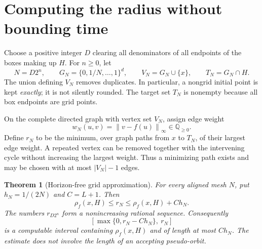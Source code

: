 \documentclass[11pt,letterpaper]{article}
\numberwithin{equation}{section}
\newtheorem{theorem}{Theorem}[section]
\theoremstyle{definition}
\theoremstyle{remark}
\newcommand{\Q}{\mathbb Q}
\newcommand{\norm}[1]{\left\lVert #1\right\rVert_{\infty}}
\begin{document}
\section{Computing the radius without bounding time}
\label{pqc:cb:sec:grid}

Choose a positive integer $D$ clearing all denominators of all endpoints of
the boxes making up $H$.  For $n\ge0$, let
\[
 N=D2^n,\qquad G_N=\{0,1/N,\ldots,1\}^d,
 \qquad V_N=G_N\cup\{x\},\qquad T_N=G_N\cap H.
\]
The union defining $V_N$ removes duplicates.  In particular, a nongrid initial
point is kept \emph{exactly}; it is not silently rounded.  The target set $T_N$
is nonempty because all box endpoints are grid points.

On the complete directed graph with vertex set $V_N$, assign edge weight
\begin{equation}
 w_N(u,v)=\norm{v-f(u)}\in\Q_{\ge0}.
 \label{pqc:cb:eq:weights}
\end{equation}
Define $r_N$ to be the minimum, over graph paths from $x$ to $T_N$, of their
largest edge weight.  A repeated vertex can be removed together with the
intervening cycle without increasing the largest weight.  Thus a minimizing
path exists and may be chosen with at most $|V_N|-1$ edges.

\begin{theorem}[Horizon-free grid approximation]
\label{pqc:cb:thm:grid}
For every aligned mesh $N$, put $h_N=1/(2N)$ and $C=L+1$.  Then
\begin{equation}
 \rho_f(x,H)\le r_N\le\rho_f(x,H)+Ch_N.
 \label{pqc:cb:eq:grid-bound}
\end{equation}
The numbers $r_{D2^n}$ form a nonincreasing rational sequence.  Consequently
\begin{equation}
 \left[\max\{0,r_N-Ch_N\},\ r_N\right]
 \label{pqc:cb:eq:interval}
\end{equation}
is a computable interval containing $\rho_f(x,H)$ and of length at most $Ch_N$.
The estimate does not involve the length of an accepting pseudo-orbit.
\end{theorem}
\end{document}

